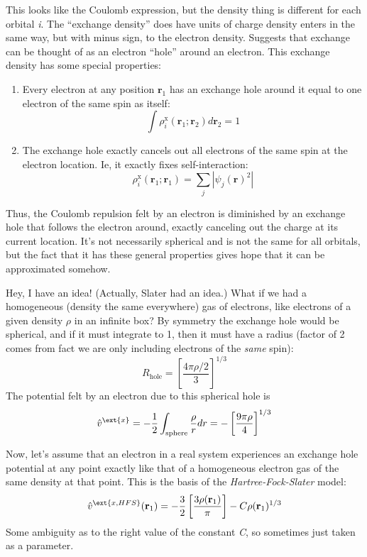 \documentclass[11pt]{article}
\begin{document}
This looks like the Coulomb expression, but the density thing is different for each orbital \emph{i}.  The ``exchange density'' does have units of charge density enters in the same way, but with minus sign, to the electron density. Suggests that exchange can be thought of as an electron ``hole'' around an electron.  This exchange density has some special properties:

\begin{enumerate}
\item Every electron at any position \(\mathbf{r}_1\) has an exchange hole around it equal to one electron of the same spin as itself:
\[ \int \rho_i^{\text{x}}(\mathbf{r}_1;\mathbf{r}_2) d\mathbf{r}_2 = 1 \]
\item The exchange hole exactly cancels out all electrons of the same spin at the electron location.  Ie, it exactly fixes self-interaction:
\[\rho_i^{\text{x}}(\mathbf{r}_1;\mathbf{r}_1) = \sum_j |\psi_j(\mathbf{r})^2|\]
\end{enumerate}

Thus, the Coulomb repulsion felt by an electron is diminished by an exchange hole that
follows the electron around, exactly canceling out the charge at its current location.
It’s not necessarily spherical and is not the same for all orbitals, but the fact that it
has these general properties gives hope that it can be approximated somehow.

Hey, I have an idea!  (Actually, Slater had an idea.) What if we had a homogeneous (density the same everywhere) gas of electrons, like electrons of a given density \(\rho\) in an infinite box?  By symmetry the exchange hole would be spherical, and if it must integrate to 1, then it must have a radius (factor of 2 comes from fact we are only including electrons of the \emph{same} spin):
\[R_\text{hole} = \left [\frac{4\pi\rho/2}{3} \right ]^{1/3} \]
The potential felt by an electron due to this spherical hole is
\[\hat{v}^\ext{x} = -\frac{1}{2}\int_\text{sphere}\frac{\rho}{r}dr = - \left [\frac{9\pi\rho}{4}\right ]^{1/3} \]

Now, let's assume that an electron in a real system experiences an exchange hole potential at any point exactly like that of a homogeneous electron gas of the same density at that point.  This is the basis of the \emph{Hartree-Fock-Slater} model:
\[\hat{v}^\ext{x,HFS}(\mathbf{r}_1) =-\frac{3}{2}\left[\frac{3\rho(\mathbf{r}_1)}{\pi} \right] -C\rho(\mathbf{r}_1)^{1/3} \]
Some ambiguity as to the right value of the constant \emph{C}, so sometimes just taken as a parameter.
\end{document}
